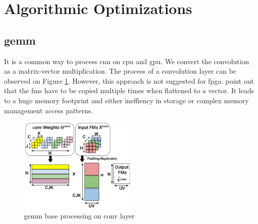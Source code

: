\section{Algorithmic Optimizations} \label{sec:algopti}
\subsection{\acrfull{gemm}}
It is a common way to process \acrshort{cnn} on \acrshort{cpu} and \acrshort{gpu}. We convert the convolution as a matrix-vector multiplication.  The process of a convolution layer can be observed on Figure \ref{fig:gemm}.
However, this approach is not suggested for \acrshort{fpga}: \cite{sze_efficient_2017, zhu_efficient_2020} point out that the \acrshort{fm}s have to be copied multiple times when flattened to a vector. It leads to a huge memory footprint and either ineffiency in storage or complex memory management access patterns.
\begin{figure}
    \centering
    \includegraphics[width=0.5\textwidth]{Images/gemm.pdf}
    \caption{\acrshort{gemm} base processing on conv layer}
    \label{fig:gemm}
\end{figure}

